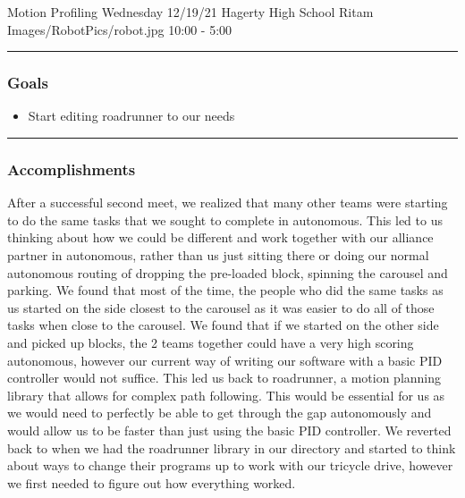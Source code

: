 \insertmeeting 
	{Motion Profiling Wednesday} 
	{12/19/21} 
	{Hagerty High School}
	{Ritam}
	{Images/RobotPics/robot.jpg}
	{10:00 - 5:00}
	
\noindent\hfil\rule{\textwidth}{.4pt}\hfil
\subsubsection*{Goals}
\begin{itemize}
    \item Start editing roadrunner to our needs 

\end{itemize} 

\noindent\hfil\rule{\textwidth}{.4pt}\hfil

\subsubsection*{Accomplishments}
After a successful second meet, we realized that many other teams were starting to do the same tasks that we sought to complete in autonomous. This led to us thinking about how we could be different and work together with our alliance partner in autonomous, rather than us just sitting there or doing our normal autonomous routing of dropping the pre-loaded block, spinning the carousel and parking. We found that most of the time, the people who did the same tasks as us started on the side closest to the carousel as it was easier to do all of those tasks when close to the carousel. We found that if we started on the other side and picked up blocks, the 2 teams together could have a very high scoring autonomous, however our current way of writing our software with a basic PID controller would not suffice. This led us back to roadrunner, a motion planning library that allows for complex path following. This would be essential for us as we would need to perfectly be able to get through the gap autonomously and would allow us to be faster than just using the basic PID controller. We reverted back to when we had the roadrunner library in our directory and started to think about ways to change their programs up to work with our tricycle drive, however we first needed to figure out how everything worked. 



